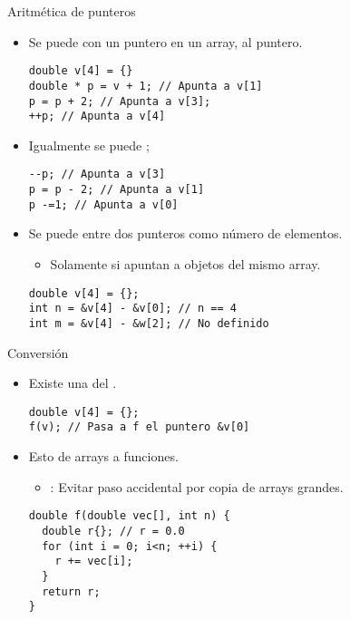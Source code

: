 \begin{frame}[t,fragile]{Aritmética de punteros}
\begin{itemize}
  \item Se puede  con un puntero en un array, 
         al puntero.
\begin{lstlisting}
double v[4] = {}
double * p = v + 1; // Apunta a v[1]
p = p + 2; // Apunta a v[3];
++p; // Apunta a v[4]
\end{lstlisting}

  \item Igualmente se puede ;
\begin{lstlisting}
--p; // Apunta a v[3]
p = p - 2; // Apunta a v[1]
p -=1; // Apunta a v[0]
\end{lstlisting}

  \item Se puede  entre dos punteros 
        como número de elementos.
    \begin{itemize}
      \item Solamente si apuntan a objetos del mismo array.
    \end{itemize}
\begin{lstlisting}
double v[4] = {};
int n = &v[4] - &v[0]; // n == 4
int m = &v[4] - &w[2]; // No definido
\end{lstlisting}
\end{itemize}
\end{frame}

\begin{frame}[t,fragile]{Conversión}
\begin{itemize}
  \item Existe una  
        del .
\begin{lstlisting}
double v[4] = {};
f(v); // Pasa a f el puntero &v[0]
\end{lstlisting}

  \item Esto  de arrays a funciones.
    \begin{itemize}
      \item {}: Evitar paso accidental por copia de arrays grandes.
    \end{itemize}
\begin{lstlisting}
double f(double vec[], int n) {
  double r{}; // r = 0.0
  for (int i = 0; i<n; ++i) {
    r += vec[i];
  }
  return r;
}
\end{lstlisting}
\end{itemize}
\end{frame}

